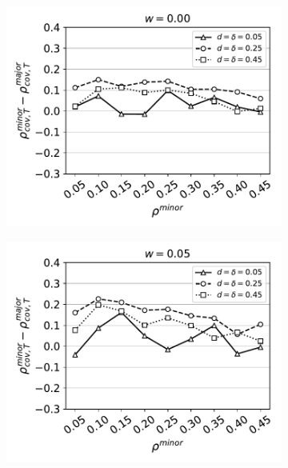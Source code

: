 
\begin{figure}[H]
  \centering
  \begin{subfigure}{0.315\textwidth}
    \includegraphics[width=\textwidth]{Figures/full-minority-homophily=0p00.pdf}
  \end{subfigure}
  \begin{subfigure}{0.315\textwidth}
    \includegraphics[width=\textwidth]{Figures/full-minority-homophily=0p05.pdf}
  \end{subfigure}
  \begin{subfigure}{0.315\textwidth}

\end{subfigure}
\end{figure}
